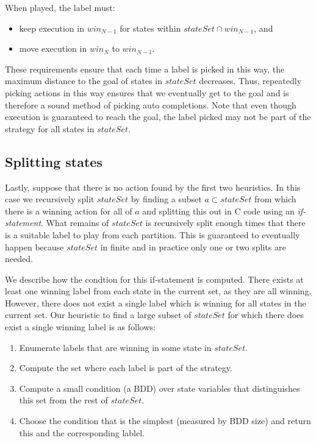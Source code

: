 When played, the label must:

\begin{itemize}
    \item keep execution in $win_{N-1}$ for states within $stateSet \cap win_{N-1}$, and
    \item move execution in $win_N$ to $win_{N-1}$.
\end{itemize}

These requirements ensure that each time a label is picked in this way, the maximum distance to the goal of states in $stateSet$ decreases. Thus, repeatedly picking actions in this way ensures that we eventually get to the goal and is therefore a sound method of picking auto completions. Note that even though execution is guaranteed to reach the goal, the label picked may not be part of the strategy for all states in $stateSet$.

\subsection{Splitting states}

Lastly, suppose that there is no action found by the first two heuristics. In this case we recursively split $stateSet$ by finding a subset $a \subset stateSet$ from which there is a winning action for all of $a$ and splitting this out in C code using an \emph{if-statement}. What remains of $stateSet$ is recursively split enough times that there is a suitable label to play from each partition. This is guaranteed to eventually happen because $stateSet$ in finite and in practice only one or two splits are needed.

We describe how the condtion for this if-statement is computed. There exists at least one winning label from each state in the current set, as they are all winning. However, there does not exist a single label which is winning for all states in the current set. Our heuristic to find a large subset of $stateSet$ for which there does exist a single winning label is as follows:

\begin{enumerate}
    \item Enumerate labels that are winning in some state in $stateSet$.
    \item Compute the set where each label is part of the strategy.
    \item Compute a small condition (a BDD) over state variables that distinguishes this set from the rest of $stateSet$.
    \item Choose the condition that is the simplest (measured by BDD size) and return this and the corresponding lablel.
\end{enumerate}

